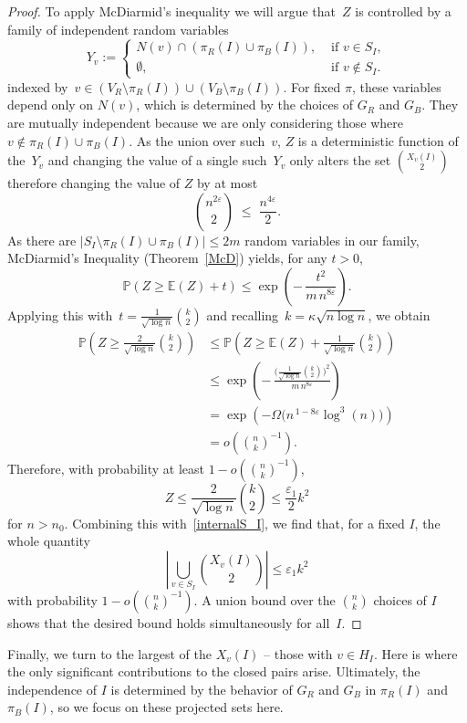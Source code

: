 \documentclass{article}
\newcommand{\E}{\mathbb{E}}
\renewcommand{\P}{\mathbb{P}}
\begin{document}
\begin{proof}
To apply McDiarmid’s inequality we will argue that~$Z$ is controlled by a family of independent random variables
\[
  Y_v := 
  \begin{cases}
      N(v) \cap (\pi_R(I) \cup \pi_B(I)),&\text{ if }v\in S_I,\\
      \emptyset,&\text{ if }v\notin S_I.
  \end{cases}
\]
indexed by~${v\in (V_R\setminus \pi_R(I))\cup (V_B\setminus \pi_B(I))}$.
For fixed $\pi$, these variables depend only on $N(v)$, which is determined by the choices of $G_R$ and $G_B$. They are mutually independent because we are only considering those where $v \not \in \pi_R(I)\cup\pi_B(I)$. As the union over such~$v$, $Z$ is a deterministic function of the~$Y_v$ and changing the value of a single such~$Y_{v}$ only alters the set $\binom{X_v(I)}{2}$ therefore changing the value of $Z$
by at most
\[
  \binom{n^{2\varepsilon}}{2} \;\le\; \frac{n^{4\varepsilon}}{2}.
\]
As there are $|S_I \setminus \pi_R(I) \cup \pi_B(I)| \leq 2{m}$ random variables in our family,   McDiarmid's Inequality (Theorem~\ref{McD}) yields, for any $t>0$,
\[
  \P\left(Z \ge \E (Z) + t\right) \leq
  \exp\left(-\,\frac{t^2}{{m}\,n^{8\varepsilon}}\right).
\]
Applying this with~$t = \frac{1}{\sqrt{\log n}}\binom{k}{2}$ and recalling~$k=\kappa\sqrt{n\log n}$, we obtain
\begin{align*}
  \P\left( Z \ge \frac{2}{\sqrt{\log n}}\binom{k}{2} \right)
  &\le \P\left( Z \ge \E(Z) + \frac{1}{\sqrt{\log n}}\binom{k}{2} \right) \\
  &\le \exp\left(-\,\frac{\bigl(\frac{1}{\sqrt{\log n}}\binom{k}{2}\bigr)^2}{{m}\,n^{8\varepsilon}}\right) \\
  &= \exp\left(-\Omega\bigl(n^{\,1-8\varepsilon}\log^{3} (n)\bigr)\right) \\
  &= o\left(\binom{n}{k}^{-1}\right).
\end{align*}
Therefore, with probability at least $1-o\left(\binom{n}{k}^{-1}\right)$,
\[
  Z \leq \frac{2}{\sqrt{\log n}}\binom{k}{2}
  \leq \frac{\varepsilon_1}{2}k^2
\]
for $n>n_0$. 
Combining this with~\eqref{internalS_I},
we find that, for a fixed $I$, the whole quantity
\[
  \left| \bigcup_{v \in S_I} {X_{v}(I)\choose 2} \right|\le \varepsilon_1 k^2
\]
with probability $1-o\left(\binom{n}{k}^{-1}\right)$.
A union bound over the $\binom{n}{k}$ choices of $I$ shows that the desired bound holds simultaneously for all~$I$.
\end{proof} 

Finally, we turn to the largest of the $X_{v}(I)$ -- those with $v \in H_I$.  Here is where the only significant contributions to the closed pairs arise. Ultimately, the independence of $I$ is determined by the behavior of $G_R$ and $G_B$ in $\pi_R(I)$ and $\pi_B(I)$, so we focus on these projected sets here.
\end{document}
